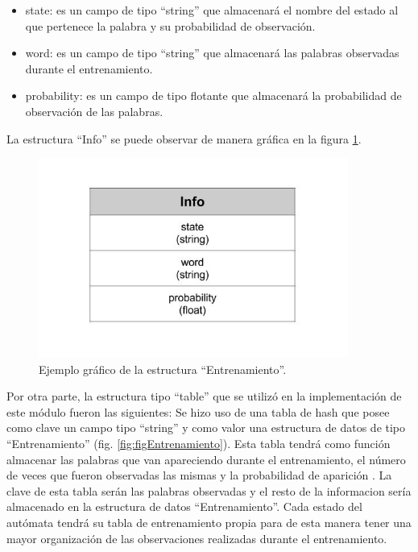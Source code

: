 \begin{itemize}
\item state: es un campo de tipo ``string'' que almacenará el nombre del
estado al que pertenece la palabra y su probabilidad de observación.
\item word: es un campo de tipo ``string'' que almacenará las palabras observadas durante el entrenamiento.
\item probability: es un campo de tipo flotante que almacenará la probabilidad de observación de las palabras.
\end{itemize}

La estructura ``Info'' se puede observar de manera gráfica en la figura
\ref{fig:figInfo}.

\begin{figure}[!htb]
\begin{center}
\includegraphics[width=4in]{./img/Info.jpg}
\caption{Ejemplo gráfico de la estructura ``Entrenamiento''.}
\label{fig:figInfo}
\end{center}
\end{figure}

Por otra parte, la estructura tipo ``table'' que se utilizó en la implementación de este módulo fueron las siguientes:
Se hizo uso de una tabla de hash que posee como clave un campo tipo
``string'' y como valor una estructura de datos de tipo ``Entrenamiento''
(fig. \ref{fig:figEntrenamiento}). Esta tabla tendrá como función almacenar las palabras que van apareciendo durante el entrenamiento, el número de veces que fueron observadas las mismas y la probabilidad de aparición . La clave de esta tabla serán las palabras observadas y el resto de la informacion sería almacenado en la estructura de datos ``Entrenamiento''.
Cada estado del autómata tendrá su tabla de entrenamiento propia para
de esta manera tener una mayor organización de las observaciones realizadas durante el entrenamiento.
